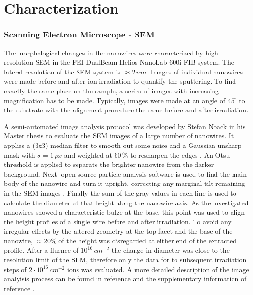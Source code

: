 \section{Characterization}

\subsubsection{Scanning Electron Microscope - SEM}

The morphological changes in the nanowires were characterized by high resolution SEM in the FEI DualBeam Helios NanoLab 600i FIB system. The lateral resolution of the SEM system is $\approx 2\,nm$. Images of individual nanowires were made before and after ion irradiation to quantify the sputtering. To find exactly the same place on the sample, a series of images with increasing magnification has to be made. Typically, images were made at an angle of $45^\circ$ to the substrate with the alignment procedure the same before and after irradiation.

A semi-automated image analysis protocol was developed by Stefan Noack in his Master thesis \cite{noack_sputter_2014, johannes_anomalous_2015} to evaluate the SEM images of a large number of nanowires. It applies a (3x3) median filter to smooth out some noise and a Gaussian unsharp mask with $\sigma = 1\,px$ and weighted at $60\,\%$ to resharpen the edges \cite{sankur_survey_2004}. An Otsu threshold \cite{otsu_threshold_1979} is applied to separate the brighter nanowire from the darker background. Next, open source particle analysis software is used to find the main body of the nanowire and turn it upright, correcting any marginal tilt remaining in the SEM images \cite{schindelin_fiji:_2012,sage_imagej_2012}. Finally the sum of the gray-values in each line is used to calculate the diameter at that height along the nanowire axis. As the investigated nanowires showed a characteristic bulge at the base, this point was used to align the height profiles of a single wire before and after irradiation. To avoid any irregular effects by the altered geometry at the top facet and the base of the nanowire, $\approx 20\%$ of the height was disregarded at either end of the extracted profile. After a fluence of $10^{16}\,cm^{-2}$ the change in diameter was close to the resolution limit of the SEM, therefore only the data for to subsequent irradiation steps of $2\cdot 10^{16}\,cm^{-2}$ ions was evaluated. A more detailed description of the image analyisis process can be found in reference \cite{noack_sputter_2014} and the supplementary information of reference \cite{johannes_anomalous_2015}.

